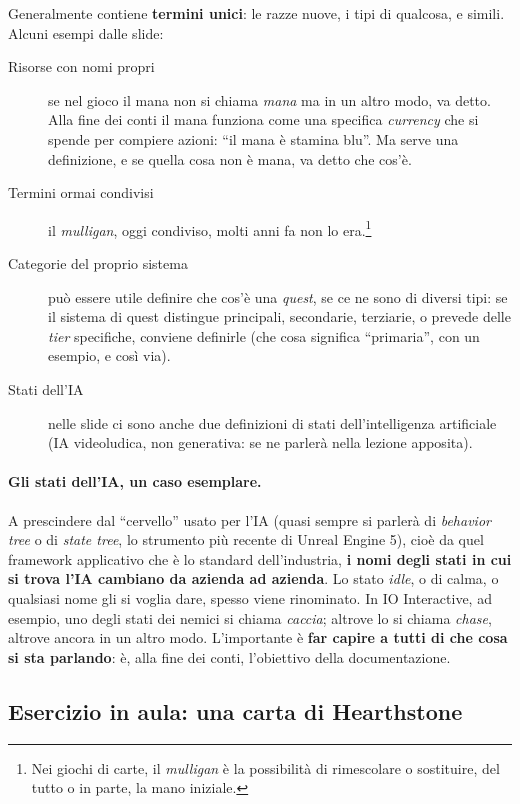 Generalmente contiene \textbf{termini unici}: le razze nuove, i tipi di
qualcosa, e simili. Alcuni esempi dalle slide:
\begin{description}
  \item[Risorse con nomi propri] se nel gioco il mana non si chiama
        \emph{mana} ma in un altro modo, va detto. Alla fine dei conti il mana
        funziona come una specifica \emph{currency} che si spende per compiere
        azioni: ``il mana è stamina blu''. Ma serve una definizione, e se
        quella cosa non è mana, va detto che cos'è.
  \item[Termini ormai condivisi] il \emph{mulligan}, oggi condiviso, molti anni
        fa non lo era.\footnote{Nei giochi di carte, il \emph{mulligan} è la
        possibilità di rimescolare o sostituire, del tutto o in parte, la mano
        iniziale.}
  \item[Categorie del proprio sistema] può essere utile definire che cos'è
        una \emph{quest}, se ce ne sono di diversi tipi: se il sistema di quest
        distingue principali, secondarie, terziarie, o prevede delle
        \emph{tier} specifiche, conviene definirle (che cosa significa
        ``primaria'', con un esempio, e così via).
  \item[Stati dell'IA] nelle slide ci sono anche due definizioni di stati
        dell'intelligenza artificiale (IA videoludica, non generativa: se ne
        parlerà nella lezione apposita).
\end{description}

\paragraph{Gli stati dell'IA, un caso esemplare.} A prescindere dal
``cervello'' usato per l'IA (quasi sempre si parlerà di \emph{behavior tree}
o di \emph{state tree}, lo strumento più recente di Unreal Engine 5), cioè da
quel framework applicativo che è lo standard dell'industria, \textbf{i nomi
degli stati in cui si trova l'IA cambiano da azienda ad azienda}. Lo stato
\emph{idle}, o di calma, o qualsiasi nome gli si voglia dare, spesso viene
rinominato. In IO Interactive, ad esempio, uno degli stati dei nemici si
chiama \emph{caccia}; altrove lo si chiama \emph{chase}, altrove ancora in un
altro modo. L'importante è \textbf{far capire a tutti di che cosa si sta
parlando}: è, alla fine dei conti, l'obiettivo della documentazione.

\subsection{Esercizio in aula: una carta di Hearthstone}

